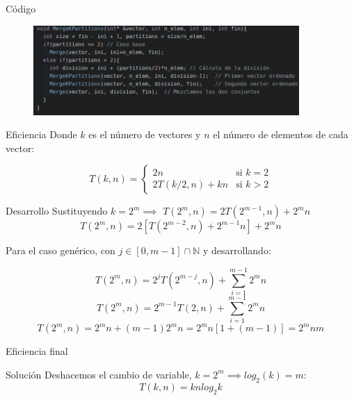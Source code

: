 \begin{frame}
	\begin{block}{Código} %
		\begin{figure}[h]
    		\centering
    		\includegraphics[width=0.9\textwidth]{./Imagenes/dyv.png}
    		\label{fig:mesh1}
		\end{figure}
	\end{block}
\end{frame}


\begin{frame}
	\begin{block}{Eficiencia}
	Donde $k$ es el n\'umero de vectores y $n$ el n\'umero de elementos de cada vector:

	\[T(k,n) = \left \{ 
	\begin{matrix} 
		2n & 				\mbox{si } k=2
	\\ 2T(k/2,n) + kn & 		\mbox{si } k>2
	\end{matrix}
	\right.\]
	\end{block}
\end{frame}

\begin{frame}
	\begin{block}{Desarrollo}
	Sustituyendo $k=2^m \implies$ $T(2^m, n) = 2T(2^{m-1}, n) + 2^mn$
	\[T(2^m, n) = 2\left[ T(2^{m-2}, n) + 2^{m-1}n \right] + 2^mn\]
	\begin{center}
	Para el caso gen\'erico, con $j \in \left[0,m-1\right] \cap\mathbb{N}$ y 						desarrollando:
	\end{center}
	\[T(2^m, n)	= 2^jT(2^{m-j}, n) + \sum_{i=1}^{m-1} 2^mn\]
	\[T(2^m, n) = 2^{m-1} T(2, n) + \sum_{i=1}^{m-1} 2^mn\]
	\[T(2^m, n) = 2^mn + (m-1) 2^mn = 2^mn[1+(m-1)] = 2^mnm\]
	\end{block}
\end{frame}

\begin{frame}{Eficiencia final}
	\begin{block}{Solución}
	Deshacemos el cambio de variable, $k=2^m \implies log_2(k)=m$:
	\[T(k,n) = knlog_2k\]
	\end{block}
\end{frame}

